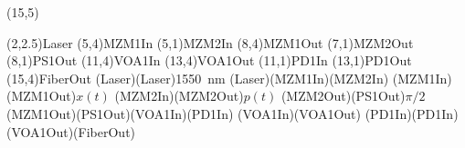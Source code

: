 \documentclass[pstricks]{standalone}
\begin{document}
	\begin{pspicture}[showgrid](15,5)
		\begin{optexp}
		  	\pnode(2,2.5){Laser}
		  	\pnode(5,4){MZM1In}
	  		\pnode(5,1){MZM2In}
			\pnode(8,4){MZM1Out}
		  	\pnode(7,1){MZM2Out}
		  	\pnode(8,1){PS1Out}
		  	\pnode(11,4){VOA1In}
		  	\pnode(13,4){VOA1Out}
		  	\pnode(11,1){PD1In}
		  	\pnode(13,1){PD1Out}
		  	\pnode(15,4){FiberOut}
			\optbox[position=start, optboxsize=2 1, labeloffset=0](Laser)(Laser){\SI{1550}{\nano\meter}}
			\wdmsplitter(Laser)(MZM1In)(MZM2In)
			\optmzm(MZM1In)(MZM1Out){$x(t)$}
			\optmzm(MZM2In)(MZM2Out){$p(t)$}
			\optbox[optboxsize=1 0.8, labeloffset=0](MZM2Out)(PS1Out){$\pi/2$}
			\optcoupler(MZM1Out)(PS1Out)(VOA1In)(PD1In)
			\optmzm(VOA1In)(VOA1Out)
			\optdetector[dettype=diode](PD1In)(PD1In)
			\optfiber[addtoFiberOut={arrows=->}](VOA1Out)(FiberOut)
		\end{optexp}
	\end{pspicture}
\end{document}
